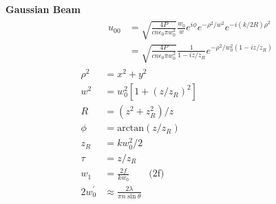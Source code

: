 \documentclass[12pt]{article}
\begin{document}
\begin{multicols}{2}
\textbf{Gaussian Beam}
\begin{align}
  &\begin{aligned}
    u_{00} &= \sqrt{\frac{4 P}{c n \epsilon_0 \pi w_0^2}} \frac{w_0}{w}e^{i\phi}e^{-\rho^2/w^2}e^{-i(k/2R)\rho^2}\\
    &= \sqrt{\frac{4 P}{c n \epsilon_0 \pi w_0^2}} \frac{1}{1 - iz/z_R} e^{-\rho^2 / w_0^2(1 - iz/z_R)}
   \end{aligned}\\
  \rho^2 &= x^2 + y^2\\
  w^2 &= w_0^2[1+{(z/z_R)}^2]\\
  R &= (z^2 + z_R^2) / z\\
  \phi &= \textrm{arctan}(z/z_R)\\
  z_R &= k w_0^2 / 2\\
  \tau &= z / z_R\\
  w_1 &= \frac{2f}{k w_0} \quad\quad \textrm{(2f)}\\
  2 w_0^{\prime} &\approx \frac{2\lambda}{\pi n\sin\theta}
\end{align}



\end{multicols}
\end{document}
